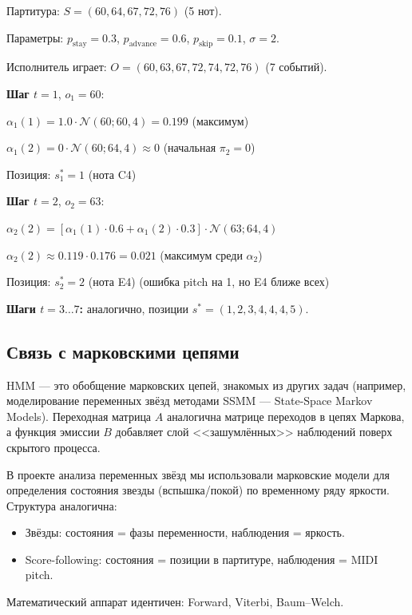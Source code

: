 \documentclass[a4paper,11pt]{article}
\begin{document}
\begin{exbox}[title={HMM: пример Forward-прохода}]
Партитура: $S = (60, 64, 67, 72, 76)$ (5 нот).

Параметры: $p_{\text{stay}} = 0.3$, $p_{\text{advance}} = 0.6$,
$p_{\text{skip}} = 0.1$, $\sigma = 2$.

Исполнитель играет: $O = (60, 63, 67, 72, 74, 72, 76)$ (7 событий).

\medskip
\textbf{Шаг $t=1$}, $o_1 = 60$:

$\alpha_1(1) = 1.0 \cdot \mathcal{N}(60; 60, 4) = 0.199$ (максимум)

$\alpha_1(2) = 0 \cdot \mathcal{N}(60; 64, 4) \approx 0$ (начальная $\pi_2 = 0$)

Позиция: $s_1^* = 1$ (нота C4) \checkmark

\medskip
\textbf{Шаг $t=2$}, $o_2 = 63$:

$\alpha_2(2) = [\alpha_1(1) \cdot 0.6 + \alpha_1(2) \cdot 0.3] \cdot \mathcal{N}(63; 64, 4)$

$\alpha_2(2) \approx 0.119 \cdot 0.176 = 0.021$ (максимум среди $\alpha_2$)

Позиция: $s_2^* = 2$ (нота E4) \checkmark\; (ошибка pitch на 1, но E4 ближе всех)

\medskip
\textbf{Шаги $t=3\ldots7$:} аналогично, позиции $s^* = (1, 2, 3, 4, 4, 4, 5)$.
\end{exbox}

\subsection{Связь с марковскими цепями}

HMM --- это обобщение марковских цепей, знакомых из других задач
(например, моделирование переменных звёзд методами SSMM ---
State-Space Markov Models). Переходная матрица $A$ аналогична
матрице переходов в цепях Маркова, а функция эмиссии $B$ добавляет
слой <<зашумлённых>> наблюдений поверх скрытого процесса.

\begin{notebox}[title={Связь HMM и переменных звёзд}]
В проекте анализа переменных звёзд мы использовали марковские модели
для определения состояния звезды (вспышка/покой) по временному ряду
яркости. Структура аналогична:
\begin{itemize}[leftmargin=1.5em]
  \item Звёзды: состояния = фазы переменности, наблюдения = яркость.
  \item Score-following: состояния = позиции в партитуре, наблюдения = MIDI pitch.
\end{itemize}
Математический аппарат идентичен: Forward, Viterbi, Baum--Welch.
\end{notebox}
\end{document}
